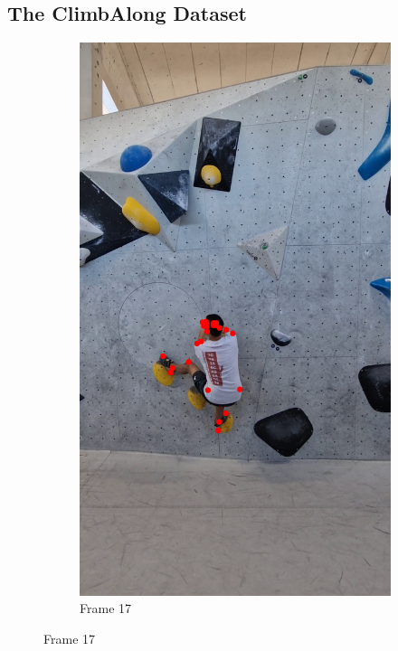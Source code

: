 \documentclass[./main.tex]{subfiles}
\begin{document}
\subsection{The ClimbAlong Dataset}
\begin{figure}[htbp]
    \centering
    \begin{subfigure}{0.3\textwidth}
        \centering
        \includegraphics[width=\textwidth]{entities/CA_17.png}
        \caption{Frame 17}
    \end{subfigure}

\end{figure}
\end{document}
